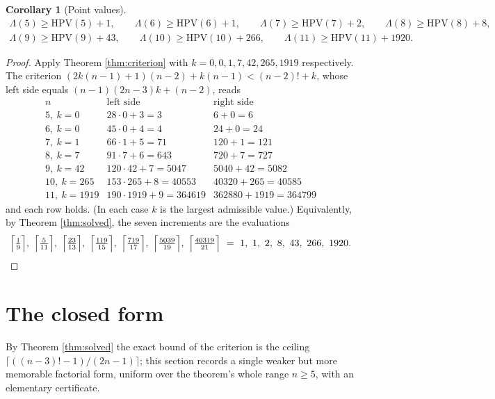 \documentclass[11pt]{article}
\newtheorem{corollary}[theorem]{Corollary}
\newcommand{\HPV}{\mathrm{HPV}}
\begin{document}
\begin{corollary}[Point values]\label{cor:pointvalues}
\begin{gather*}
  \Lambda(5)\ge\HPV(5)+1,\qquad
  \Lambda(6)\ge\HPV(6)+1,\qquad
  \Lambda(7)\ge\HPV(7)+2,\qquad
  \Lambda(8)\ge\HPV(8)+8,\\
  \Lambda(9)\ge\HPV(9)+43,\qquad
  \Lambda(10)\ge\HPV(10)+266,\qquad
  \Lambda(11)\ge\HPV(11)+1920.
\end{gather*}
\end{corollary}

\begin{proof}
Apply Theorem \ref{thm:criterion} with \(k=0,0,1,7,42,265,1919\) respectively.  The criterion
\((2k(n-1)+1)(n-2)+k(n-1)<(n-2)!+k\), whose left side equals \((n-1)(2n-3)k+(n-2)\), reads
\[
\begin{array}{c|c|c}
n & \text{left side} & \text{right side}\\ \hline
5,\ k=0 & 28\cdot0+3=3 & 6+0=6\\
6,\ k=0 & 45\cdot0+4=4 & 24+0=24\\
7,\ k=1 & 66\cdot1+5=71 & 120+1=121\\
8,\ k=7 & 91\cdot7+6=643 & 720+7=727\\
9,\ k=42 & 120\cdot42+7=5047 & 5040+42=5082\\
10,\ k=265 & 153\cdot265+8=40553 & 40320+265=40585\\
11,\ k=1919 & 190\cdot1919+9=364619 & 362880+1919=364799
\end{array}
\]
and each row holds.  (In each case \(k\) is the largest admissible value.)  Equivalently, by
Theorem \ref{thm:solved}, the seven increments are the evaluations
\[
  \Bigl\lceil\tfrac{1}{9}\Bigr\rceil,\
  \Bigl\lceil\tfrac{5}{11}\Bigr\rceil,\
  \Bigl\lceil\tfrac{23}{13}\Bigr\rceil,\
  \Bigl\lceil\tfrac{119}{15}\Bigr\rceil,\
  \Bigl\lceil\tfrac{719}{17}\Bigr\rceil,\
  \Bigl\lceil\tfrac{5039}{19}\Bigr\rceil,\
  \Bigl\lceil\tfrac{40319}{21}\Bigr\rceil
  \ =\ 1,\ 1,\ 2,\ 8,\ 43,\ 266,\ 1920.
\]
\end{proof}

\section{The closed form}

By Theorem \ref{thm:solved} the exact bound of the criterion is the ceiling
\(\lceil((n-3)!-1)/(2n-1)\rceil\); this section records a single weaker but more
memorable factorial form, uniform over the theorem's whole range \(n\ge5\), with an
elementary certificate.
\end{document}
